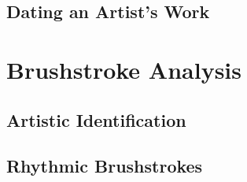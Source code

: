 \documentclass[conference]{IEEEtran}
\begin{document}
\subsection{Dating an Artist's Work}

\section{Brushstroke Analysis}

\subsection{Artistic Identification}

\subsection{Rhythmic Brushstrokes}









\end{document}
